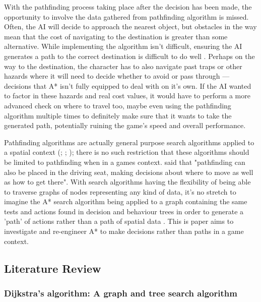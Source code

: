 \documentclass[11pt, a4paper]{article}
\begin{document}
With the pathfinding process taking place after the decision has been made, the opportunity to involve the data gathered from pathfinding algorithm is missed. Often, the AI will decide to approach the nearest object, but obstacles in the way mean that the cost of navigating to the destination is greater than some alternative. While implementing the algorithm isn't difficult, ensuring the AI generates a path to the correct destination is difficult to do well \parencite{forbus2002qualitative}. Perhaps on the way to the destination, the character has to also navigate past traps or other hazards where it will need to decide whether to avoid or pass through --- decisions that A* isn't fully equipped to deal with on it's own. If the AI wanted to factor in these hazards and real cost values, it would have to perform a more advanced check on where to travel too, maybe even using the pathfinding algorithm multiple times to definitely make sure that it wants to take the generated path, potentially ruining the game's speed and overall performance.

Pathfinding algorithms are actually general purpose search algorithms applied to a spatial context (\cite[125]{cui2011based}; \cite[6]{orkin2003applying}; \cite[46]{yap2002grid}); there is no such restriction that these algorithms should be limited to pathfinding when in a games context. \citeauthor{millington2019ai} \parencite*[197]{millington2019ai} said that "pathfinding can also be placed in the driving seat, making decisions about where to move as well as how to get there". With search algorithms having the flexibility of being able to traverse graphs of nodes representing any kind of data, it's no stretch to imagine the A* search algorithm being applied to a graph containing the same tests and actions found in decision and behaviour trees in order to generate a 'path' of actions rather than a path of spatial data \parencite[114]{higgins2002generic}. This is paper aims to investigate and re-engineer A* to make decisions rather than paths in a game context.

\subsection{Literature Review}

\subsubsection{Dijkstra's algorithm: A graph and tree search algorithm}
\end{document}
